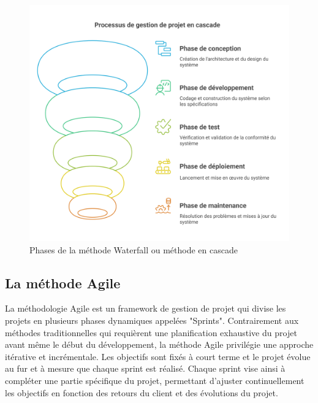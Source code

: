 \vspace{0.3cm}

\begin{figure}[H]
\begin{center}
\includegraphics[width=15cm]{assets/presentation/waterfall.png}
\end{center}
\caption{Phases de la méthode Waterfall ou méthode en cascade}
\end{figure}

\subsection*{La méthode Agile}
La méthodologie Agile est un framework de gestion de projet qui divise les projets en plusieurs phases dynamiques appelées "Sprints". Contrairement aux méthodes traditionnelles qui requièrent une planification exhaustive du projet avant même le début du développement, la méthode Agile privilégie une approche itérative et incrémentale. Les objectifs sont fixés à court terme et le projet évolue au fur et à mesure que chaque sprint est réalisé. Chaque sprint vise ainsi à compléter une partie spécifique du projet, permettant d’ajuster continuellement les objectifs en fonction des retours du client et des évolutions du projet.

\vspace{0.3cm}

